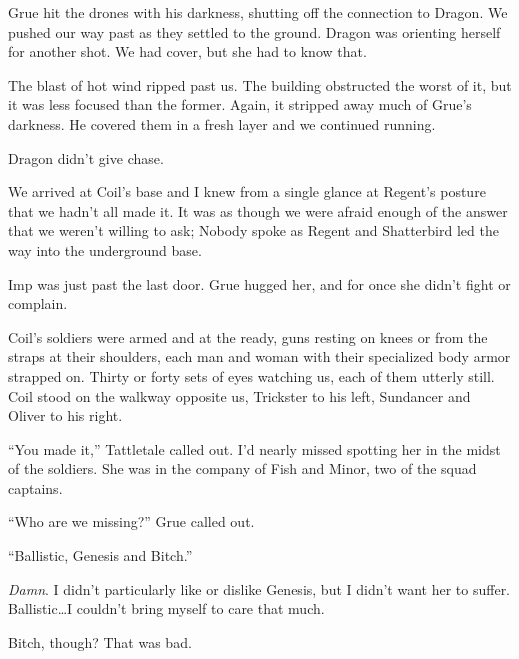 Grue hit the drones with his darkness, shutting off the connection to Dragon.  We pushed our way past as they settled to the ground.  Dragon was orienting herself for another shot. We had cover, but she had to know that.



The blast of hot wind ripped past us.  The building obstructed the worst of it, but it was less focused than the former.  Again, it stripped away much of Grue's darkness.  He covered them in a fresh layer and we continued running.



Dragon didn't give chase.



\blacksquare



We arrived at Coil's base and I knew from a single glance at Regent's posture that we hadn't all made it.  It was as though we were afraid enough of the answer that we weren't willing to ask; Nobody spoke as Regent and Shatterbird led the way into the underground base.



Imp was just past the last door.  Grue hugged her, and for once she didn't fight or complain.



Coil's soldiers were armed and at the ready, guns resting on knees or from the straps at their shoulders, each man and woman with their specialized body armor strapped on.  Thirty or forty sets of eyes watching us, each of them utterly still.  Coil stood on the walkway opposite us, Trickster to his left, Sundancer and Oliver to his right.



``You made it,'' Tattletale called out.  I'd nearly missed spotting her in the midst of the soldiers.  She was in the company of Fish and Minor, two of the squad captains.



``Who are we missing?'' Grue called out.



``Ballistic, Genesis and Bitch.''



\emph{Damn}.  I didn't particularly like or dislike Genesis, but I didn't want her to suffer.  Ballistic\ldots I couldn't bring myself to care that much.



Bitch, though?  That was bad.



